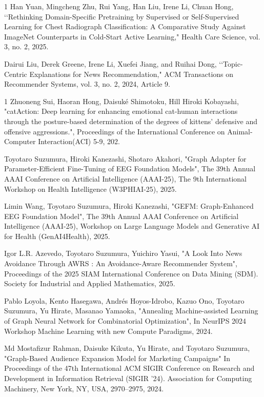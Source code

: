 \begin{雑誌論文}{1}
Han Yuan, Mingcheng Zhu, Rui Yang, Han Liu, Irene Li, Chuan Hong, \lq\lq Rethinking Domain-Specific Pretraining by Supervised or Self-Supervised Learning for Chest Radiograph Classification: A Comparative Study Against ImageNet Counterparts in Cold-Start Active Learning," Health Care Science, vol. 3, no. 2, 2025.

Dairui Liu, Derek Greene, Irene Li, Xuefei Jiang, and Ruihai Dong, \lq\lq Topic-Centric Explanations for News Recommendation," ACM Transactions on Recommender Systems, vol. 3, no. 2, 2024, Article 9.

\end{雑誌論文}

\begin{査読付}{1}
Zhuoneng Sui, Haoran Hong, Daisuké Shimotoku, Hill Hiroki Kobayashi, "catAction: Deep learning for enhancing emotional cat-human interactions through the posture-based determination of the degrees of kittens' defensive and offensive aggressions.", Proceedings of the International Conference on Animal-Computer Interaction(ACI) 5-9, 202.  

Toyotaro Suzumura, Hiroki Kanezashi, Shotaro Akahori, "Graph Adapter for Parameter-Efficient Fine-Tuning of EEG Foundation Models", The 39th Annual AAAI Conference on Artificial Intelligence (AAAI-25), The 9th International Workshop on Health Intelligence (W3PHIAI-25), 2025.

Limin Wang, Toyotaro Suzumura, Hiroki Kanezashi, "GEFM: Graph-Enhanced EEG Foundation Model", The 39th Annual AAAI Conference on Artificial Intelligence (AAAI-25), Workshop on Large Language Models and Generative AI for Health (GenAI4Health), 2025.

 Igor L.R. Azevedo, Toyotaro Suzumura, Yuichiro Yasui, "A Look Into News Avoidance Through AWRS : An Avoidance-Aware Recommender System", Proceedings of the 2025 SIAM International Conference on Data Mining (SDM). Society for Industrial and Applied Mathematics, 2025.

Pablo Loyola, Kento Hasegawa, Andrés Hoyos-Idrobo, Kazuo Ono, Toyotaro Suzumura, Yu Hirate, Masanao Yamaoka, "Annealing Machine-assisted Learning of Graph Neural Network for Combinatorial Optimization", In NeurIPS 2024 Workshop Machine Learning with new Compute Paradigms, 2024.

Md Mostafizur Rahman, Daisuke Kikuta, Yu Hirate, and Toyotaro Suzumura, "Graph-Based Audience Expansion Model for Marketing Campaigns" In Proceedings of the 47th International ACM SIGIR Conference on Research and Development in Information Retrieval (SIGIR '24). Association for Computing Machinery, New York, NY, USA, 2970–2975, 2024.


\end{査読付}
